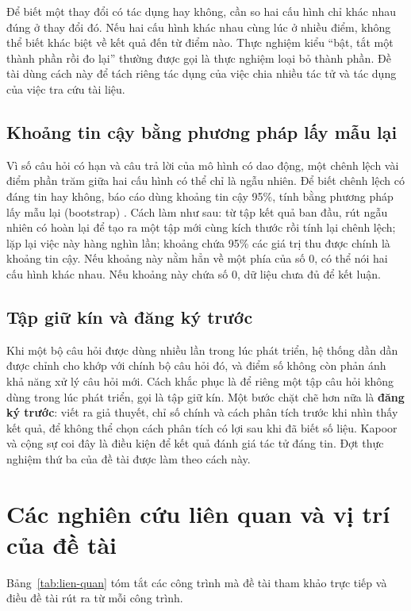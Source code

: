 Để biết một thay đổi có tác dụng hay không, cần so hai cấu hình chỉ khác nhau đúng ở thay đổi đó. Nếu hai cấu hình khác nhau cùng lúc ở nhiều điểm, không thể biết khác biệt về kết quả đến từ điểm nào. Thực nghiệm kiểu ``bật, tắt một thành phần rồi đo lại'' thường được gọi là thực nghiệm loại bỏ thành phần. Đề tài dùng cách này để tách riêng tác dụng của việc chia nhiều tác tử và tác dụng của việc tra cứu tài liệu.

\subsection{Khoảng tin cậy bằng phương pháp lấy mẫu lại}

Vì số câu hỏi có hạn và câu trả lời của mô hình có dao động, một chênh lệch vài điểm phần trăm giữa hai cấu hình có thể chỉ là ngẫu nhiên. Để biết chênh lệch có đáng tin hay không, báo cáo dùng khoảng tin cậy 95\%, tính bằng phương pháp lấy mẫu lại (bootstrap) . Cách làm như sau: từ tập kết quả ban đầu, rút ngẫu nhiên có hoàn lại để tạo ra một tập mới cùng kích thước rồi tính lại chênh lệch; lặp lại việc này hàng nghìn lần; khoảng chứa 95\% các giá trị thu được chính là khoảng tin cậy. Nếu khoảng này nằm hẳn về một phía của số 0, có thể nói hai cấu hình khác nhau. Nếu khoảng này chứa số 0, dữ liệu chưa đủ để kết luận.

\subsection{Tập giữ kín và đăng ký trước}

Khi một bộ câu hỏi được dùng nhiều lần trong lúc phát triển, hệ thống dần dần được chỉnh cho khớp với chính bộ câu hỏi đó, và điểm số không còn phản ánh khả năng xử lý câu hỏi mới. Cách khắc phục là để riêng một tập câu hỏi không dùng trong lúc phát triển, gọi là tập giữ kín. Một bước chặt chẽ hơn nữa là \textbf{đăng ký trước}: viết ra giả thuyết, chỉ số chính và cách phân tích trước khi nhìn thấy kết quả, để không thể chọn cách phân tích có lợi sau khi đã biết số liệu. Kapoor và cộng sự  coi đây là điều kiện để kết quả đánh giá tác tử đáng tin. Đợt thực nghiệm thứ ba của đề tài được làm theo cách này.

\section{Các nghiên cứu liên quan và vị trí của đề tài}

Bảng~\ref{tab:lien-quan} tóm tắt các công trình mà đề tài tham khảo trực tiếp và điều đề tài rút ra từ mỗi công trình.

